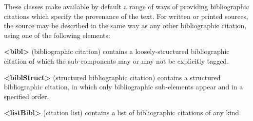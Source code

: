 \par
These classes make available by default a range of ways of providing bibliographic citations which specify the provenance of the text. For written or printed sources, the source may be described in the same way as any other bibliographic citation, using one of the following elements: 
\begin{sansreflist}
  
\item [\textbf{<bibl>}] (bibliographic citation) contains a loosely-structured bibliographic citation of which the sub-components may or may not be explicitly tagged.
\item [\textbf{<biblStruct>}] (structured bibliographic citation) contains a structured bibliographic citation, in which only bibliographic sub-elements appear and in a specified order.
\item [\textbf{<listBibl>}] (citation list) contains a list of bibliographic citations of any kind.
\end{sansreflist}
